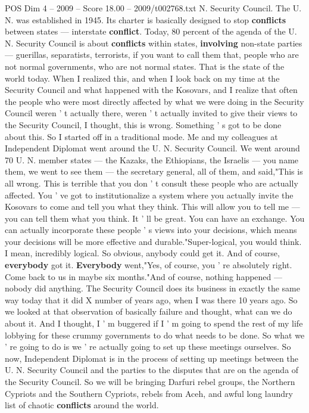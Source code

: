 \begin{textsample}{POS Dim 4 – 2009 – Score 18.00 – 2009/t002768.txt}
N.
Security Council.
The U.
N. was established in 1945.
Its charter is basically designed to stop \textbf{conflicts} between states — interstate \textbf{conflict}.
Today, 80 percent of the agenda of the U.
N.
Security Council is about \textbf{conflicts} within states, \textbf{involving} non-state parties — guerillas, separatists, terrorists, if you want to call them that, people who are not normal governments, who are not normal states.
That is the state of the world today.
When I realized this, and when I look back on my time at the Security Council and what happened with the Kosovars, and I realize that often the people who were most directly affected by what we were doing in the Security Council weren ' t actually there, weren ' t actually invited to give their views to the Security Council, I thought, this is wrong.
Something ' s got to be done about this.
So I started off in a traditional mode.
Me and my colleagues at Independent Diplomat went around the U.
N.
Security Council.
We went around 70 U.
N. member states — the Kazaks, the Ethiopians, the Israelis — you name them, we went to see them — the secretary general, all of them, and said,"This is all wrong.
This is terrible that you don ' t consult these people who are actually affected.
You ' ve got to institutionalize a system where you actually invite the Kosovars to come and tell you what they think.
This will allow you to tell me — you can tell them what you think.
It ' ll be great.
You can have an exchange.
You can actually incorporate these people ' s views into your decisions, which means your decisions will be more effective and durable."Super-logical, you would think.
I mean, incredibly logical.
So obvious, anybody could get it.
And of course, \textbf{everybody} got it. \textbf{Everybody} went,"Yes, of course, you ' re absolutely right.
Come back to us in maybe six months."And of course, nothing happened — nobody did anything.
The Security Council does its business in exactly the same way today that it did X number of years ago, when I was there 10 years ago.
So we looked at that observation of basically failure and thought, what can we do about it.
And I thought, I ' m buggered if I ' m going to spend the rest of my life lobbying for these crummy governments to do what needs to be done.
So what we ' re going to do is we ' re actually going to set up these meetings ourselves.
So now, Independent Diplomat is in the process of setting up meetings between the U.
N.
Security Council and the parties to the disputes that are on the agenda of the Security Council.
So we will be bringing Darfuri rebel groups, the Northern Cypriots and the Southern Cypriots, rebels from Aceh, and awful long laundry list of chaotic \textbf{conflicts} around the world.

\end{textsample}
